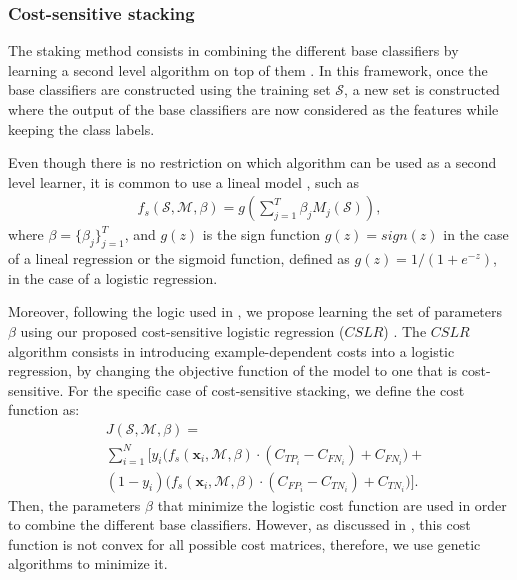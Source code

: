 {  \subsubsection*{Cost-sensitive stacking}
  
  The staking method consists in combining the different base classifiers by learning a 
  second level algorithm on top of them \citep{Wolpert1992}. In this framework, once the base 
  classifiers are constructed using the training set  $\mathcal{S}$, a new set is constructed 
  where the output of the base classifiers  are now considered as the features while keeping the 
  class labels.
  
  Even though there is no restriction on which algorithm can be used as a second level learner, 
  it is common to use a lineal model \citep{Zhou2012}, such as 
  \begin{align}
    f_s(\mathcal{S},\mathcal{M},\mathcal{\beta}) =
    g \left( \sum_{j=1}^T \beta_j M_j(\mathcal{S}) \right),
  \end{align}
  where $\mathcal{\beta}=\{\beta_j\}_{j=1}^T$, and $g(z)$ is the sign function 
  \mbox{$g(z)=sign(z)$} in the case of a lineal regression or the sigmoid function, defined 
  as \mbox{$g(z)=1/(1+e^{-z})$}, in the case of a logistic regression. 
  
  Moreover, following the logic used in \citep{Nesbitt2010}, we propose learning the set of  
  parameters $\mathcal{\beta}$  using our proposed cost-sensitive logistic regression ($CSLR$) 
  \citep{CorreaBahnsen2014b}. The $CSLR$ algorithm consists in introducing example-dependent costs 
  into a logistic regression, by changing the objective function of the model to one that is 
  cost-sensitive. For the specific case of cost-sensitive stacking, we define the cost function as: 
  \begin{align}
    &J(\mathcal{S},\mathcal{M},\beta)= \nonumber \\
    & \sum_{i=1}^{N} \bigg[ y_i\bigg( 
    f_s(\mathbf{x}_i,\mathcal{M},\mathcal{\beta}) \cdot(C_{TP_i} - C_{FN_i}) + C_{FN_i} \bigg) + 
    \nonumber \\
    & (1-y_i)\bigg( f_s(\mathbf{x}_i,\mathcal{M},\mathcal{\beta}) \cdot(C_{FP_i} - C_{TN_i}) 
      +C_{TN_i} \bigg) \bigg].
  \end{align}
  Then, the parameters $\beta$ that minimize the logistic cost function are used in order to 
  combine the different base classifiers. However, as discussed in \citep{CorreaBahnsen2014b}, 
  this cost function is not convex for all possible cost matrices, therefore, we use genetic 
  algorithms to minimize it.
  
}
